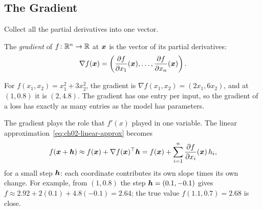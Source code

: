 \subsection{The Gradient}
\label{sec:ch02-gradient}

Collect all the partial derivatives into one vector.

\begin{definition}[Gradient]
  \label{def:gradient}
  The \emph{gradient} of $f\colon \mathbb{R}^n \to \mathbb{R}$ at $\bm{x}$ is the vector
  of its partial derivatives:
  \[
    \nabla f(\bm{x}) =
    \left( \frac{\partial f}{\partial x_1}(\bm{x}), \dots,
           \frac{\partial f}{\partial x_n}(\bm{x}) \right).
  \]
\end{definition}

For $f(x_1, x_2) = x_1^2 + 3x_2^2$, the gradient is
$\nabla f(x_1, x_2) = (2x_1, 6x_2)$, and at $(1, 0.8)$ it is $(2, 4.8)$. The
gradient has one entry per input, so the gradient of a loss has exactly as
many entries as the model has parameters.

The gradient plays the role that $f'(x)$ played in one variable. The linear
approximation~\eqref{eq:ch02-linear-approx} becomes
\begin{equation}
  f(\bm{x} + \bm{h}) \approx f(\bm{x}) + \nabla f(\bm{x})^\top \bm{h}
  = f(\bm{x}) + \sum_{i=1}^n \frac{\partial f}{\partial x_i}(\bm{x})\, h_i ,
  \label{eq:ch02-linear-approx-n}
\end{equation}
for a small step $\bm{h}$: each coordinate contributes its own slope
times its own change. For example, from $(1, 0.8)$ the step
$\bm{h} = (0.1, -0.1)$ gives
$f \approx 2.92 + 2(0.1) + 4.8(-0.1) = 2.64$; the true value
$f(1.1, 0.7) = 2.68$ is close.

